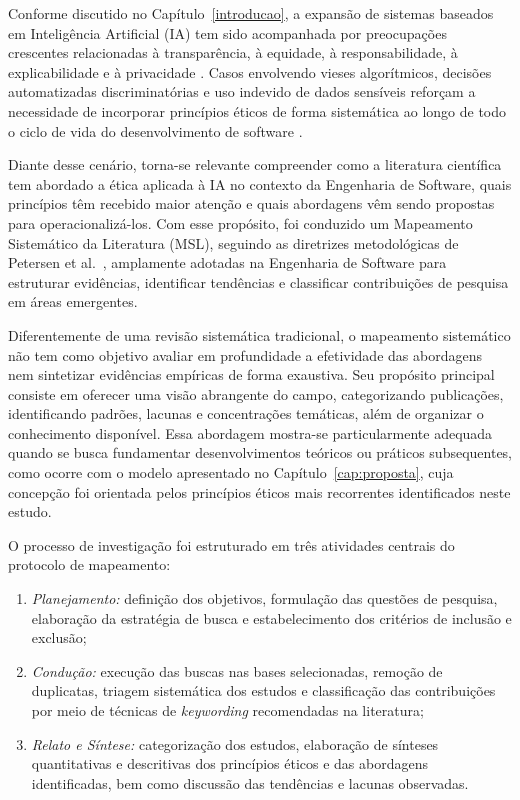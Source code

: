\label{cap:rsl}

Conforme discutido no Capítulo~\ref{introducao}, a expansão de sistemas baseados em Inteligência Artificial (IA) tem sido acompanhada por preocupações crescentes relacionadas à transparência, à equidade, à responsabilidade, à explicabilidade e à privacidade \cite{Floridi2018, Jobin2019, Ryan2020, S058}. Casos envolvendo vieses algorítmicos, decisões automatizadas discriminatórias e uso indevido de dados sensíveis reforçam a necessidade de incorporar princípios éticos de forma sistemática ao longo de todo o ciclo de vida do desenvolvimento de software \cite{Mittelstadt2019, Hagendorff2020, S058, Reddy2024}.

Diante desse cenário, torna-se relevante compreender como a literatura científica tem abordado a ética aplicada à IA no contexto da Engenharia de Software, quais princípios têm recebido maior atenção e quais abordagens vêm sendo propostas para operacionalizá-los. Com esse propósito, foi conduzido um Mapeamento Sistemático da Literatura (MSL), seguindo as diretrizes metodológicas de Petersen et al.~\cite{Petersen2015}, amplamente adotadas na Engenharia de Software para estruturar evidências, identificar tendências e classificar contribuições de pesquisa em áreas emergentes.

Diferentemente de uma revisão sistemática tradicional, o mapeamento sistemático não tem como objetivo avaliar em profundidade a efetividade das abordagens nem sintetizar evidências empíricas de forma exaustiva. Seu propósito principal consiste em oferecer uma visão abrangente do campo, categorizando publicações, identificando padrões, lacunas e concentrações temáticas, além de organizar o conhecimento disponível. Essa abordagem mostra-se particularmente adequada quando se busca fundamentar desenvolvimentos teóricos ou práticos subsequentes, como ocorre com o modelo apresentado no Capítulo~\ref{cap:proposta}, cuja concepção foi orientada pelos princípios éticos mais recorrentes identificados neste estudo.

O processo de investigação foi estruturado em três atividades centrais do protocolo de mapeamento:

\begin{enumerate}
    \item \textit{Planejamento:} definição dos objetivos, formulação das questões de pesquisa, elaboração da estratégia de busca e estabelecimento dos critérios de inclusão e exclusão;

    \item \textit{Condução:} execução das buscas nas bases selecionadas, remoção de duplicatas, triagem sistemática dos estudos e classificação das contribuições por meio de técnicas de \textit{keywording} recomendadas na literatura;

    \item \textit{Relato e Síntese:} categorização dos estudos, elaboração de sínteses quantitativas e descritivas dos princípios éticos e das abordagens identificadas, bem como discussão das tendências e lacunas observadas.
\end{enumerate}


